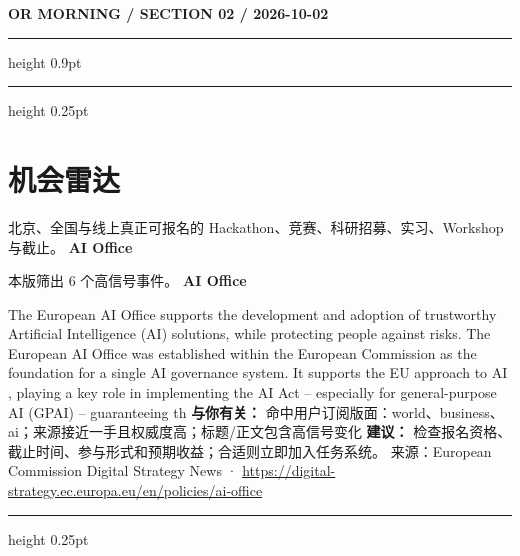 \documentclass[10.5pt]{ctexart}
\begin{document}
\newpage
{\small\bfseries OR MORNING / SECTION 02 / 2026-10-02}
\vspace{2mm}
\hrule height 0.9pt
\vspace{1.5mm}
\hrule height 0.25pt
\vspace{4mm}
\section*{机会雷达}
{\color{ormuted} 北京、全国与线上真正可报名的 Hackathon、竞赛、科研招募、实习、Workshop 与截止。}
\vspace{2mm}
{\LARGE\bfseries AI Office}\par
\vspace{1mm}
{\color{ormuted} 本版筛出 6 个高信号事件。}
\vspace{3mm}
{\Large\bfseries AI Office}\par
The European AI Office supports the development and adoption of trustworthy Artificial Intelligence (AI) solutions, while protecting people against risks. The European AI Office was established within the European Commission as the foundation for a single AI governance system. It supports the EU approach to AI , playing a key role in implementing the AI Act – especially for general-purpose AI (GPAI) – guaranteeing th
\textbf{与你有关：} 命中用户订阅版面：world、business、ai；来源接近一手且权威度高；标题/正文包含高信号变化
\textbf{建议：} 检查报名资格、截止时间、参与形式和预期收益；合适则立即加入任务系统。
{\footnotesize\color{ormuted} 来源：European Commission Digital Strategy News · \url{https://digital-strategy.ec.europa.eu/en/policies/ai-office}}
\vspace{4mm}
\hrule height 0.25pt
\vspace{3mm}
\end{document}
